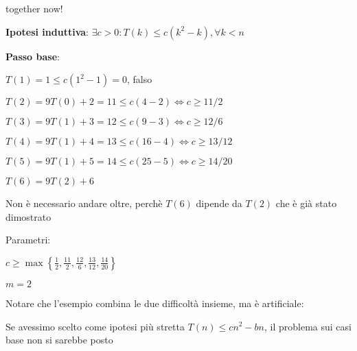 \begin{frame}{together now!}
\begin{overprint}

\BIL
\item {\bf Ipotesi induttiva}: \alert{$\exists c>0: T(k) \leq c(k^2-k), \forall k < n$}
\item {\bf Passo base}:
\BI
 \item $T(1) = 1 \leq c(1^2-1) = 0$, falso
 \item $T(2) = 9T(0)+ 2 = 11 \leq c(4-2) \Leftrightarrow c \geq 11/2$
 \item $T(3) = 9T(1)+ 3 = 12 \leq c(9-3) \Leftrightarrow c \geq 12/6$
 \item $T(4) = 9T(1)+ 4 = 13 \leq c(16-4) \Leftrightarrow c \geq 13/12$
 \item $T(5) = 9T(1)+ 5 = 14 \leq c(25-5) \Leftrightarrow c \geq 14/20$
 \item $T(6) = 9T(2)+ 6$
\EI
\item Non è necessario andare oltre, perchè $T(6)$ dipende da $T(2)$ che è già 
stato dimostrato
\EIL
	
	
\BIL
\item Parametri:
\BI
\item $c \geq \max \left\{ \frac{1}{2}, \frac{11}{2}, \frac{12}{6}, \frac{13}{12}, \frac{14}{20} \right\}$	
\item $m=2$
\EI
\item Notare che l'esempio combina le due difficoltà insieme, ma è artificiale:
\BI
\item Se avessimo scelto come ipotesi più stretta \alert{$T(n) \leq cn^2 - bn$}, il
problema sui casi base non si sarebbe posto
\EI
\EIL	

\end{overprint}
	
\end{frame}






